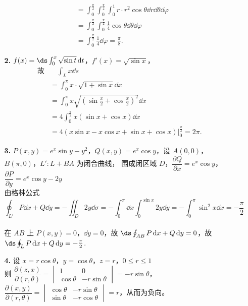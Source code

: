 \documentclass{ctexart}
\begin{document}
\begin{enumerate}
\begin{enumerate}
\begin{align*}
        & =\int_{0}^{\frac{\pi}{2}}\int_{0}^{\frac{\pi}{2}}\int_0^1r\cdot r^2\cos\theta\dd{r}\dd{\theta}\dd{\varphi} \\
        & =\int_0^{\frac{\pi}{2}}\int_0^{\frac{\pi}{2}}\frac{1}{4}\cos\theta\dd{\theta}\dd{\varphi} \\
        & =\int_0^{\frac{\pi}{2}}\frac{1}{4}\dd{\varphi}=\frac{\pi}{8}.
        \end{align*}
        \item[\textbf{2.}] $f(x)=\ds\int_0^x\sqrt{\sin t}\dd{t}$，$f'(x)=\sqrt{\sin x}$，
        \begin{align*}
        \text{故} &\quad\int_L x\dd{s} \\
        & =\int_0^{\pi}x\cdot\sqrt{1+\sin x}\dd{x} \\
        & =\int_0^{\pi}x\sqrt{(\sin\frac{x}{2}+\cos\frac{x}{2})^2}\dd{x} \\
        & =4\int_0^{\frac{\pi}{2}}x(\sin x+\cos x)\dd{x} \\
        & =4(x\sin x-x\cos x+\sin x+\cos x)\vert_0^{\frac{\pi}{2}}=2\pi.
        \end{align*}
        \item[\textbf{3.}] $P(x,y)=e^x\sin y-y^2$，$Q(x,y)=e^x\cos y$，设 $A(0,0)$，$B(\pi,0)$，$L':L+\overline{BA}$ 为闭合曲线，
        围成闭区域 $D$，$\dfrac{\partial Q}{\partial x}=e^x\cos y$，$\dfrac{\partial P}{\partial y}=e^x\cos y-2y$ \\
        由格林公式 $$\oint_{L'}P\dd{x}+Q\dd{y}=-\iint_D 2y\dd{\sigma}=-\int_0^\pi\dd{x}\int_0^{\sin x}2y\dd{y}=-\int_0^\pi \sin^2x\dd{x}=-\frac{\pi}{2}$$ \\
        在 $AB$ 上 $P(x,y)=0$，$\dd{y}=0$，故 $\ds\oint_{AB}P\dd{x}+Q\dd{y}=0$，故 $\ds\oint_{L}P\dd{x}+Q\dd{y}=-\frac{\pi}{2}$.
        \item[\textbf{4.}] 设 $x=r\cos\theta$，$y=\cos\theta$，$z=r$，$0\le r\le 1$ \\
        则 $\dfrac{\partial(z,x)}{\partial(r,\theta)}=\begin{vmatrix}
        1 & 0 \\
        \cos\theta & -r\sin\theta
        \end{vmatrix}=-r\sin\theta$，$\dfrac{\partial(x,y)}{\partial(r,\theta)}=\begin{vmatrix}
        \cos\theta & -r\sin\theta \\
        \sin\theta & -r\cos\theta
        \end{vmatrix}=r$，从而为负向。
        \begin{align*}

\end{align*}
\end{enumerate}
\end{enumerate}
\end{document}
